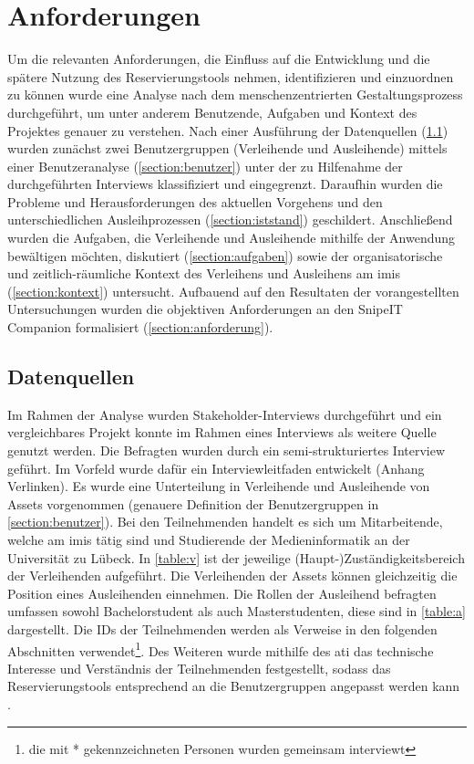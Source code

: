 
\chapter{Anforderungen}
\label{chapter-analyse}

Um die relevanten Anforderungen, die Einfluss auf die Entwicklung und die spätere Nutzung des
Reservierungstools nehmen, identifizieren und einzuordnen zu können wurde eine Analyse nach dem
menschenzentrierten Gestaltungsprozess durchgeführt, um unter anderem Benutzende, Aufgaben und
Kontext des Projektes genauer zu verstehen. Nach einer Ausführung der Datenquellen
(\ref{section:daten}) wurden zunächst zwei Benutzergruppen (Verleihende und Ausleihende) mittels
einer Benutzeranalyse (\ref{section:benutzer}) unter der zu Hilfenahme der durchgeführten Interviews
klassifiziert und eingegrenzt. Daraufhin wurden die Probleme und Herausforderungen des aktuellen
Vorgehens und den unterschiedlichen Ausleihprozessen (\ref{section:iststand}) geschildert. Anschließend
wurden die Aufgaben, die Verleihende und Ausleihende mithilfe der Anwendung bewältigen möchten,
diskutiert (\ref{section:aufgaben}) sowie der organisatorische und zeitlich-räumliche Kontext des
Verleihens und Ausleihens am \ac{imis} (\ref{section:kontext}) untersucht. Aufbauend auf den
Resultaten der vorangestellten Untersuchungen wurden die objektiven Anforderungen an den SnipeIT
Companion formalisiert (\ref{section:anforderung}).

\section{Datenquellen}
\label{section:daten}
Im Rahmen der Analyse wurden Stakeholder-Interviews durchgeführt und ein vergleichbares Projekt
konnte im Rahmen eines Interviews als weitere Quelle genutzt werden. Die Befragten wurden durch ein
semi-strukturiertes Interview geführt. Im Vorfeld wurde dafür ein Interviewleitfaden entwickelt
(Anhang Verlinken). Es wurde eine Unterteilung in Verleihende und Ausleihende von Assets vorgenommen
(genauere Definition der Benutzergruppen in \ref{section:benutzer}). Bei den Teilnehmenden handelt
es sich um Mitarbeitende, welche am \ac{imis} tätig sind und Studierende der Medieninformatik an der
Universität zu Lübeck. In \ref{table:v} ist der jeweilige (Haupt-)Zuständigkeitsbereich der
Verleihenden aufgeführt. Die Verleihenden der Assets können gleichzeitig die Position eines
Ausleihenden einnehmen. Die Rollen der Ausleihend befragten umfassen sowohl Bachelorstudent als auch
Masterstudenten, diese sind in \ref{table:a} dargestellt. Die IDs der Teilnehmenden werden als
Verweise in den folgenden Abschnitten verwendet\footnote{die mit * gekennzeichneten Personen wurden
gemeinsam interviewt}. Des Weiteren wurde mithilfe des \ac{ati} das technische Interesse und
Verständnis der Teilnehmenden festgestellt, sodass das Reservierungstools entsprechend an die
Benutzergruppen angepasst werden kann \cite{attig_assessing_2017}.


